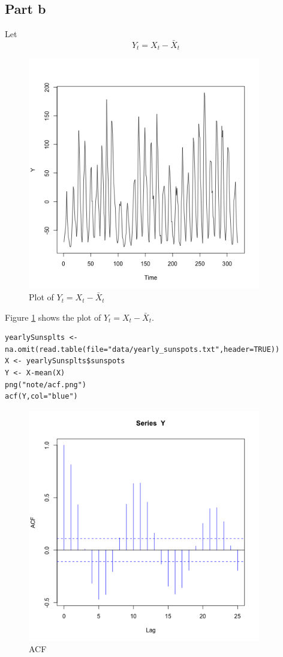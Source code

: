 \documentclass[11pt, oneside]{article}   	%
\begin{document}
 \subsection{Part b}
 Let 
 \begin{equation}
 Y_{t} = X_{t} - \bar{X}_{t}
 \end{equation}
 \begin{figure}[H] %
    \centering
    \includegraphics[width=4in]{y.png} 
    \caption{Plot of $ Y_{t} = X_{t} - \bar{X}_{t}$}
    \label{fig:y}
 \end{figure}
 \justify
 Figure \ref{fig:y} shows the plot of $ Y_{t} = X_{t} - \bar{X}_{t}$.
 
 
 \begin{lstlisting}
yearlySunsplts <- na.omit(read.table(file="data/yearly_sunspots.txt",header=TRUE))
X <- yearlySunsplts$sunspots
Y <- X-mean(X)
png("note/acf.png")
acf(Y,col="blue")
 \end{lstlisting}
 
  
 \begin{figure}[H] %
    \centering
    \includegraphics[width=4in]{acf.png} 
    \caption{ACF}
    \label{fig:acf}
 \end{figure}
 
\end{document}
